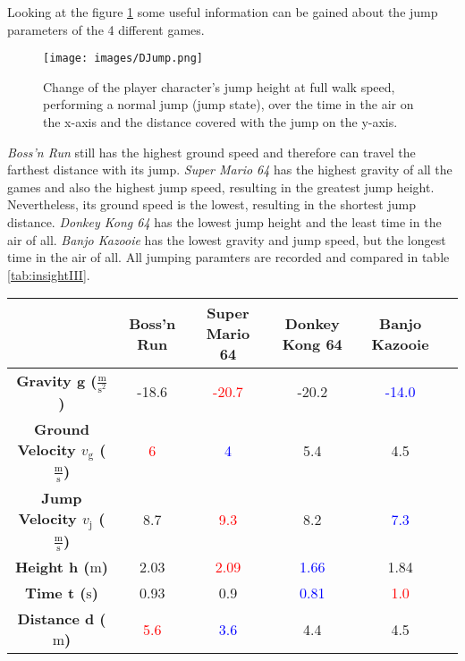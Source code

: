 \documentclass[letterpaper, 10 pt, conference]{ieeeconf}  %
\begin{document}
Looking at the figure \ref{fig:jump} some useful information can be gained about the jump parameters of the 4 different games.

\begin{figure}[!ht]
    \caption{ Change of the player character's jump height at full walk speed, performing a normal jump (jump state), over the time in the air on the x-axis and the distance covered with the jump on the y-axis.}
    \centering
    \texttt{[image: images/DJump.png]}
    \label{fig:jump}
\end{figure}

\textit{Boss'n Run} still has the highest ground speed and therefore can travel the farthest distance with its jump.
\textit{Super Mario 64} has the highest gravity of all the games and also the highest jump speed, resulting in the greatest jump height. Nevertheless, its ground speed is the lowest, resulting in the shortest jump distance.
\textit{Donkey Kong 64} has the lowest jump height and the least time in the air of all.
\textit{Banjo Kazooie} has the lowest gravity and jump speed, but the longest time in the air of all.
All jumping paramters are recorded and compared in table \ref{tab:insightIII}.

\begin{table*}[htbp]
    \centering
    \begin{tabular}{cccccc}
    \toprule
     & \textbf{Boss'n Run} & \textbf{Super Mario 64} & \textbf{Donkey Kong 64} & \textbf{Banjo Kazooie} \\
    \midrule
    \textbf{Gravity g ($\frac{\mathrm{m}}{\mathrm{s^2}}$)} & -18.6 & \textcolor{red}{-20.7} & -20.2 & \textcolor{blue}{-14.0} \\
    \textbf{Ground Velocity $v_{\text{g}}$ ($\frac{\mathrm{m}}{\mathrm{s}}$)} & \textcolor{red}{6} & \textcolor{blue}{4} & 5.4 & 4.5 \\
    \textbf{Jump Velocity $v_{\text{j}}$ ($\frac{\mathrm{m}}{\mathrm{s}}$)} & 8.7 & \textcolor{red}{9.3} & 8.2 & \textcolor{blue}{7.3} \\
    \textbf{Height h ($\mathrm{m}$)} & 2.03 & \textcolor{red}{2.09} & \textcolor{blue}{1.66} & 1.84 \\
    \textbf{Time t ($\mathrm{s}$)} & 0.93 & 0.9 & \textcolor{blue}{0.81} & \textcolor{red}{1.0} \\
    \textbf{Distance d ($\mathrm{m}$)} & \textcolor{red}{5.6} & \textcolor{blue}{3.6} & 4.4 & 4.5 \\
    \bottomrule
    \end{tabular}
    \caption{Default jump parameters of the 4 games Boss'n Run, Super Mario 64, Donkey Kong 64 and Banjo Kazooie.
    For all parameters, the highest values are marked in red and the lowest in blue.}
    \label{tab:insightIII}
\end{table*}
\end{document}
